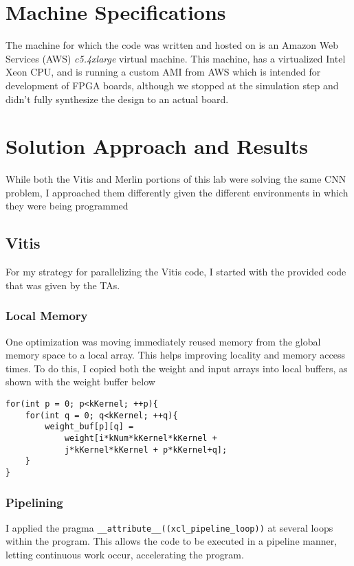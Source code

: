 \documentclass[letterpaper,twocolumn,10pt]{article}
\def\code#1{\texttt{#1}}
\begin{document}
\section{Machine Specifications}

The machine for which the code was written and hosted on is an Amazon Web
Services (AWS) \textit{c5.4xlarge} virtual machine. This machine, has a 
virtualized Intel Xeon CPU, and is running a custom AMI from AWS which is
intended for development of FPGA boards, although we stopped at the simulation
step and didn't fully synthesize the design to an actual board.

\section{Solution Approach and Results}
While both the Vitis and Merlin portions of this lab were solving the same CNN
problem, I approached them differently given the different environments in
which they were being programmed
\subsection{Vitis}
For my strategy for parallelizing the Vitis code, I started with the provided
code that was given by the TAs.
\subsubsection{Local Memory}
One optimization was moving immediately reused memory from the global memory
space to a local array. This helps improving locality and memory access times.
To do this, I copied both the weight and input arrays into local buffers, as
shown with the weight buffer below
\begin{verbatim}
for(int p = 0; p<kKernel; ++p){
    for(int q = 0; q<kKernel; ++q){
        weight_buf[p][q] = 
            weight[i*kNum*kKernel*kKernel + 
            j*kKernel*kKernel + p*kKernel+q];
    }
}
\end{verbatim}
\subsubsection{Pipelining}
I applied the pragma \code{\_\_attribute\_\_((xcl\_pipeline\_loop))} at several
loops within the program. This allows the code to be executed in a pipeline
manner, letting continuous work occur, accelerating the program.
\end{document}
